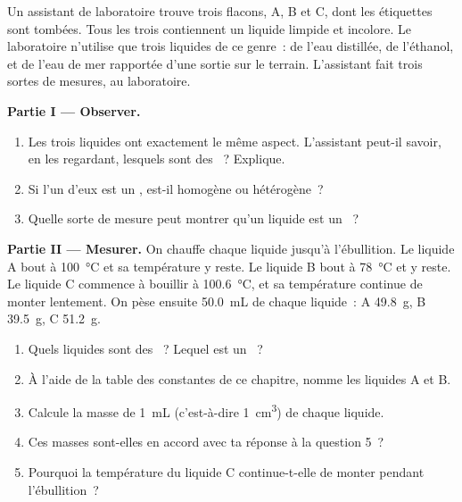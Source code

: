 \begin{problem}
\label{pb:g6:pure-substances-and-mixtures:1}
Un assistant de laboratoire trouve trois flacons, A, B et C, dont les
étiquettes sont tombées. Tous les trois contiennent un liquide limpide
et incolore. Le laboratoire n'utilise que trois liquides de ce genre~:
de l'eau distillée, de l'éthanol, et de l'eau de mer rapportée d'une
sortie sur le terrain. L'assistant fait trois sortes de mesures, au
laboratoire.

\medskip
\noindent\textbf{Partie I --- Observer.}
\begin{enumerate}
  \item Les trois liquides ont exactement le même aspect. L'assistant
        peut-il savoir, en les regardant, lesquels sont des ~?
        Explique.
  \item Si l'un d'eux est un , est-il homogène ou hétérogène~?
  \item Quelle sorte de mesure peut montrer qu'un liquide est un ~?
\end{enumerate}

\medskip
\noindent\textbf{Partie II --- Mesurer.}
On chauffe chaque liquide jusqu'à l'ébullition. Le liquide A bout à
\qty{100}{\celsius} et sa température y reste. Le liquide B bout à
\qty{78}{\celsius} et y reste. Le liquide C commence à bouillir à
\qty{100.6}{\celsius}, et sa température continue de monter lentement.
On pèse ensuite \qty{50.0}{mL} de chaque liquide~: A \qty{49.8}{g}, B
\qty{39.5}{g}, C \qty{51.2}{g}.
\begin{enumerate}[resume]
  \item Quels liquides sont des ~? Lequel est un ~?
  \item À l'aide de la table des constantes de ce chapitre, nomme les
        liquides A et B.
  \item Calcule la masse de \qty{1}{mL} (c'est-à-dire \qty{1}{cm^3}) de
        chaque liquide.
  \item Ces masses sont-elles en accord avec ta réponse à la question 5~?
  \item Pourquoi la température du liquide C continue-t-elle de monter
        pendant l'ébullition~?
\end{enumerate}


\end{problem}
